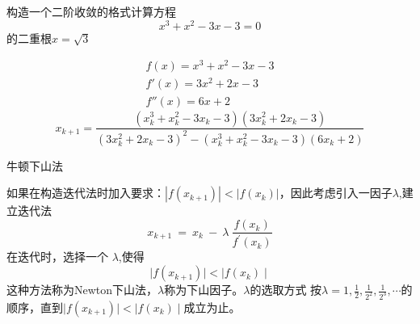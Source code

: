 \begin{example}
    构造一个二阶收敛的格式计算方程
    \[
        x^{3}+x^{2}-3x-3=0
    \]
    的二重根$x = \sqrt{3}$
    \begin{solution}
        \[
            \begin{array}{l}
                f(x) = x^{3}+x^{2}-3x-3\\
                f'(x) = 3x^{2}+2x-3\\
                f''(x) = 6x+2
            \end{array}
        \]
        \[
            x_{k+1} = \dfrac{(x_{k}^{3}+x_{k}^{2}-3x_{k}-3)(3x_{k}^{2}+2x_{k}-3)}{(3x_{k}^{2}+2x_{k}-3)^{2}-(x_{k}^{3}+x_{k}^{2}-3x_{k}-3)(6x_{k}+2)}
        \]
    \end{solution}
\end{example}
\begin{note}
    牛顿下山法

    如果在构造迭代法时加入要求：$|f(x_{k+1})|<|f(x_k)|$，因此考虑引入一因子$\lambda$,建立迭代法
    \[
        x_{k+1}\:=\:x_{k}\:-\:\lambda\:\frac{f(x_{k})}{f^{\prime}(x_{k})}
    \]
    在迭代时，选择一个 $\lambda$,使得
    \[
        \mid f(x_{k+1})\mid<\mid f(x_{k})\mid 
    \]
    这种方法称为Newton下山法，$\lambda$称为下山因子。$\lambda$的选取方式  按$\lambda=1,\frac12,\frac1{2^2},\frac1{2^3},\cdots$的顺序，直到$\mid f(x_{k+1})\mid<\mid f(x_k)\mid$成立为止。
\end{note}
